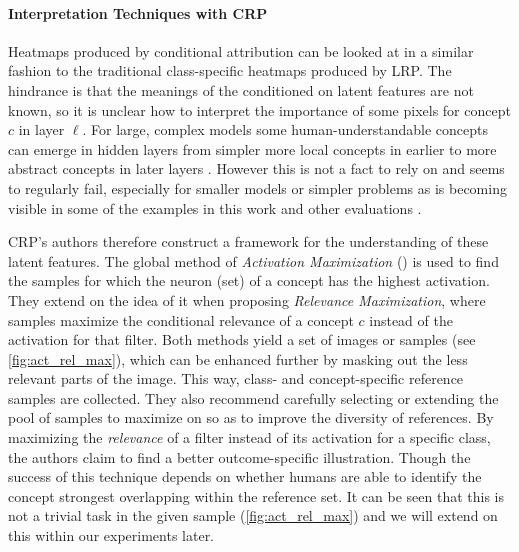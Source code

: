 \paragraph{Interpretation Techniques with CRP}
Heatmaps produced by conditional attribution can be looked at in a similar fashion to the traditional class-specific heatmaps produced by LRP. The hindrance is that the meanings of the conditioned on latent features are not known, so it is unclear how to interpret the importance of some pixels for concept $c$ in layer $\ell$. For large, complex models some human-understandable concepts can emerge in hidden layers from simpler more local concepts in earlier to more abstract concepts in later layers \cite{Bau2017, Hohman2020, Olah2017, Bau2020}. However this is not a fact to rely on and seems to regularly fail, especially for smaller models or simpler problems as is becoming visible in some of the examples in this work and other evaluations \cite{Kim2018,Singla2022, Sixt2022a}.

CRP's authors therefore construct a framework for the understanding of these latent features. The global method of \textit{Activation Maximization} (\cite{Nguyen2016}) is used to find the samples for which the neuron (set) of a concept has the highest activation. They extend on the idea of it when proposing \textit{Relevance Maximization}, where samples maximize the conditional relevance of a concept $c$ instead of the activation for that filter. Both methods yield a set of images or samples (see \cref{fig:act_rel_max}), which can be enhanced further by masking out the less relevant parts of the image. This way, class- and concept-specific reference samples are collected. They also recommend carefully selecting or extending the pool of samples to maximize on so as to improve the diversity of references. By maximizing the \textit{relevance} of a filter instead of its activation for a specific class, the authors claim to find a better outcome-specific illustration. Though the success of this technique depends on whether humans are able to identify the concept strongest overlapping within the reference set. It can be seen that this is not a trivial task in the given sample (\cref{fig:act_rel_max}) and we will extend on this within our experiments later.  


